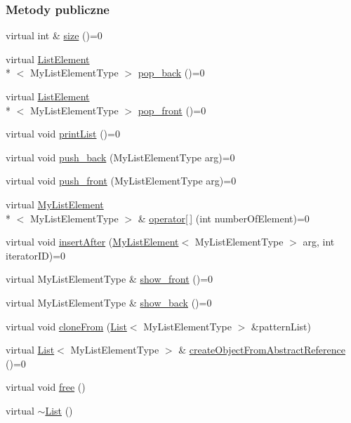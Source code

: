 \subsubsection*{Metody publiczne}
\begin{DoxyCompactItemize}
\item 
virtual int \& \hyperlink{class_list_ac769a9bcdfa13a032783bac75d8957bd}{size} ()=0
\item 
virtual \hyperlink{class_list_element}{List\-Element}\\*
$<$ My\-List\-Element\-Type $>$ \hyperlink{class_list_a2e7dc3322b64d7fd29850efdd7c2697e}{pop\-\_\-back} ()=0
\item 
virtual \hyperlink{class_list_element}{List\-Element}\\*
$<$ My\-List\-Element\-Type $>$ \hyperlink{class_list_ae8ae20b4a199d5d44a8119e49d6f50a4}{pop\-\_\-front} ()=0
\item 
virtual void \hyperlink{class_list_acfa94dc35be53ea0d7e5d4671e40dabc}{print\-List} ()=0
\item 
virtual void \hyperlink{class_list_a54af4864ee34e03aefac902744d5831f}{push\-\_\-back} (My\-List\-Element\-Type arg)=0
\item 
virtual void \hyperlink{class_list_ab87c08aded4d34550abc5df48afef599}{push\-\_\-front} (My\-List\-Element\-Type arg)=0
\item 
virtual \hyperlink{class_my_list_element}{My\-List\-Element}\\*
$<$ My\-List\-Element\-Type $>$ \& \hyperlink{class_list_aa1c32f16b6e5a7936364f5640dccfd44}{operator\mbox{[}$\,$\mbox{]}} (int number\-Of\-Element)=0
\item 
virtual void \hyperlink{class_list_a255ccc6785bf098a06f7a7f17aee134b}{insert\-After} (\hyperlink{class_my_list_element}{My\-List\-Element}$<$ My\-List\-Element\-Type $>$ arg, int iterator\-I\-D)=0
\item 
virtual My\-List\-Element\-Type \& \hyperlink{class_list_acbb16d4f43592aa83d8c02c1ffcf9c31}{show\-\_\-front} ()=0
\item 
virtual My\-List\-Element\-Type \& \hyperlink{class_list_a5dc677b4022477232d48887dde6fb28f}{show\-\_\-back} ()=0
\item 
virtual void \hyperlink{class_list_a40a3d94c7f3aa49470625d47e6485570}{clone\-From} (\hyperlink{class_list}{List}$<$ My\-List\-Element\-Type $>$ \&pattern\-List)
\item 
virtual \hyperlink{class_list}{List}$<$ My\-List\-Element\-Type $>$ \& \hyperlink{class_list_a37f6551e13258a321c806fffb7e2f068}{create\-Object\-From\-Abstract\-Reference} ()=0
\item 
virtual void \hyperlink{class_list_a5406b275bb8650707a1d2bd38f661095}{free} ()
\item 
virtual \hyperlink{class_list_a94653beeb9216aab0f06665bfa5694ab}{$\sim$\-List} ()
\end{DoxyCompactItemize}


